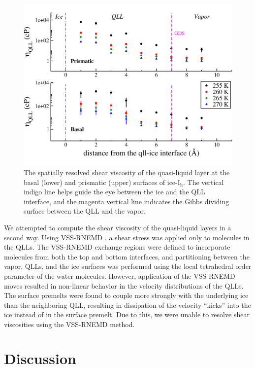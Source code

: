\begin{figure}
\includegraphics[width=\linewidth]{Figures/qllEta}
\caption{\label{fig:qllEta}The spatially resolved shear viscosity of
  the quasi-liquid layer at the basal (lower) and prismatic (upper)
  surfaces of ice-I$_\mathrm{h}$. The vertical indigo line helps guide
  the eye between the ice and the QLL interface, and the magenta
  vertical line indicates the Gibbs dividing surface between the QLL
  and the vapor.}
\end{figure} 

We attempted to compute the shear viscosity of the quasi-liquid layers
in a second way. Using VSS-RNEMD \cite{Kuang2012}, a shear stress was
applied only to molecules in the QLLs. The VSS-RNEMD exchange regions
were defined to incorporate molecules from both the top and bottom
interfaces, and partitioning between the vapor, QLLs, and the ice
surfaces was performed using the local tetrahedral order parameter of
the water molecules. However, application of the VSS-RNEMD moves
resulted in non-linear behavior in the velocity distributions of the
QLLs. The surface premelts were found to couple more strongly with the
underlying ice than the neighboring QLL, resulting in dissipation of
the velocity ``kicks'' into the ice instead of in the surface
premelt. Due to this, we were unable to resolve shear viscosities
using the VSS-RNEMD method.



\section{Discussion}

